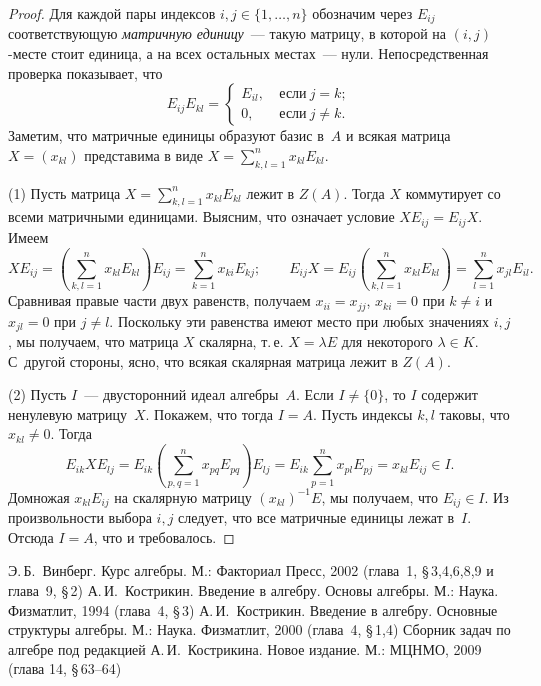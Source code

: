 \documentclass[a4paper,10pt]{amsart}
\theoremstyle{definition}
\theoremstyle{remark}
\begin{document}
\begin{proof}
Для каждой пары индексов $i,j \in \lbrace 1, \ldots, n \rbrace$
обозначим через $E_{ij}$ соответствующую \textit{матричную
единицу}~--- такую матрицу, в которой на $(i,j)$-месте стоит
единица, а на всех остальных местах~--- нули. Непосредственная
проверка показывает, что
$$
E_{ij}E_{kl} =
\begin{cases}
E_{il}, & \ \text{если} \ j = k;\\
0, & \ \text{если} \ j \ne k.
\end{cases}
$$
Заметим, что матричные единицы образуют базис в~$A$ и всякая матрица
$X = (x_{kl})$ представима в виде $X = \sum \limits_{k,l = 1}^n
x_{kl} E_{kl}$.

(1) Пусть матрица $X = \sum \limits_{k,l = 1}^n x_{kl} E_{kl}$ лежит
в $Z(A)$. Тогда $X$ коммутирует со всеми матричными единицами.
Выясним, что означает условие $XE_{ij} = E_{ij}X$. Имеем
$$
XE_{ij} = (\sum \limits_{k,l = 1}^n x_{kl} E_{kl})E_{ij} = \sum
\limits_{k = 1}^n x_{ki}E_{kj}; \qquad E_{ij}X = E_{ij}(\sum
\limits_{k,l = 1}^n x_{kl} E_{kl}) = \sum \limits_{l = 1}^n
x_{jl}E_{il}.
$$
Сравнивая правые части двух равенств, получаем $x_{ii} = x_{jj}$,
$x_{ki}=0$ при $k \ne i$ и $x_{jl}=0$ при $j \ne l$. Поскольку эти
равенства имеют место при любых значениях $i,j$, мы получаем, что
матрица $X$ скалярна, т.\,е. $X = \lambda E$ для некоторого $\lambda
\in K$. С~другой стороны, ясно, что всякая скалярная матрица лежит в
$Z(A)$.

(2) Пусть $I$~--- двусторонний идеал алгебры~$A$. Если $I \ne
\lbrace 0 \rbrace$, то $I$ содержит ненулевую матрицу~$X$. Покажем,
что тогда $I = A$. Пусть индексы $k,l$ таковы, что $x_{kl} \ne 0$.
Тогда
$$
E_{ik} X E_{lj} = E_{ik}(\sum_{p,q = 1}^n x_{pq} E_{pq}) E_{lj} =
E_{ik} \sum \limits_{p = 1}^n x_{pl}E_{pj} = x_{kl} E_{ij} \in I.
$$
Домножая $x_{kl}E_{ij}$ на скалярную матрицу $(x_{kl})^{-1}E$, мы
получаем, что $E_{ij} \in I$. Из произвольности выбора $i,j$
следует, что все матричные единицы лежат в~$I$. Отсюда $I = A$, что
и требовалось.
\end{proof}

\bigskip

\begin{thebibliography}{99}
Э.\,Б.~Винберг. Курс алгебры. М.: Факториал Пресс, 2002 (глава~1,
\S\,3,4,6,8,9 и глава~9, \S\,2)
А.\,И.~Кострикин. Введение в алгебру. Основы алгебры. М.: Наука.
Физматлит, 1994 (глава~4, \S\,3)
А.\,И.~Кострикин. Введение в алгебру. Основные структуры алгебры.
М.: Наука. Физматлит, 2000 (глава~4, \S\,1,4)
Сборник задач по алгебре под редакцией А.\,И.~Кострикина. Новое
издание. М.: МЦНМО, 2009 (глава 14, \S\,63--64)
\end{thebibliography}
\end{document}
